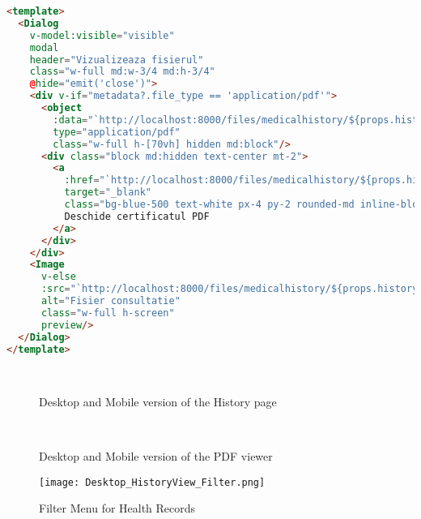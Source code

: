 \clearpage

\begin{lstlisting}[language=HTML, caption=PDF viewer Function for Health]<template>
  <Dialog
    v-model:visible="visible"
    modal
    header="Vizualizeaza fisierul"
    class="w-full md:w-3/4 md:h-3/4"
    @hide="emit('close')">
    <div v-if="metadata?.file_type == 'application/pdf'">
      <object
        :data="`http://localhost:8000/files/medicalhistory/${props.historyId}`"
        type="application/pdf"
        class="w-full h-[70vh] hidden md:block"/>
      <div class="block md:hidden text-center mt-2">
        <a
          :href="`http://localhost:8000/files/medicalhistory/${props.historyId}`"
          target="_blank"
          class="bg-blue-500 text-white px-4 py-2 rounded-md inline-block mb-4">
          Deschide certificatul PDF
        </a>
      </div>
    </div>
    <Image
      v-else
      :src="`http://localhost:8000/files/medicalhistory/${props.historyId}`"
      alt="Fisier consultatie"
      class="w-full h-screen"
      preview/>
  </Dialog>
</template>
\end{lstlisting}

\clearpage

\begin{figure}[ht]
  \centering
  \\[\baselineskip]
  \caption{Desktop and Mobile version of the History page}\label{fig:healthrecordspage}
\end{figure}

\begin{figure}[ht]
  \centering
  \\[\baselineskip]
  \caption{Desktop and Mobile version of the PDF viewer}\label{fig:pdfviewer}
\end{figure}

\FloatBarrier{}

\begin{figure}[htbp]
  \centering
  \texttt{[image: Desktop\_HistoryView\_Filter.png]}
  \caption{Filter Menu for Health Records}\label{fig:filtermenu}
\end{figure}


